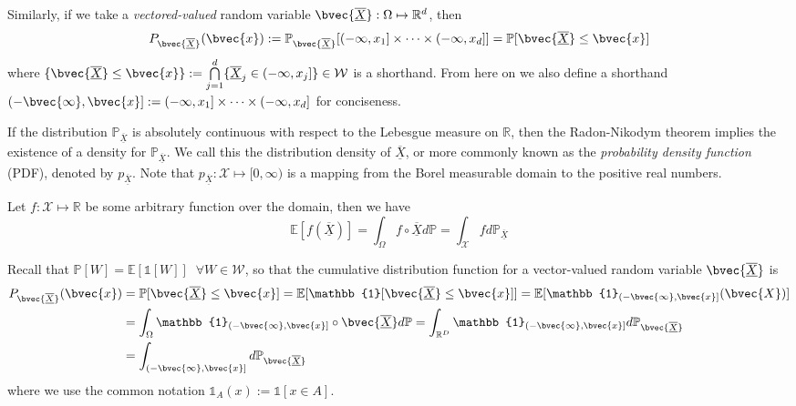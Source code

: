 \documentclass[twoside]{article} \usepackage{aistats2017}
\newcommand{\rv}[1]{\underline{\overline{#1}}}
\begin{document}
		Similarly, if we take a \textit{vectored-valued} random variable $\bvec{\rv{X}} : \Omega \mapsto \mathbb{R}^{d}$, then 
		\begin{equation}
			P_{\bvec{\rv{X}}}(\bvec{x}) := \mathbb{P}_{\bvec{\rv{X}}}[(-\infty, x_{1}] \times \dots \times (-\infty, x_{d}]] = \mathbb{P}[\bvec{\rv{X}} \leq \bvec{x}]
		\label{eq:cdf_vector}
		\end{equation}
		where $\{\bvec{\rv{X}} \leq \bvec{x}\} := \bigcap\limits_{j = 1}^{d} \{\rv{X}_{j} \in (-\infty, x_{j}]\} \in \mathcal{W}$ is a shorthand. From here on we also define a shorthand $(-\bvec{\infty}, \bvec{x}] := (-\infty, x_{1}] \times \dots \times (-\infty, x_{d}]$ for conciseness.
				
		
		If the distribution $\mathbb{P}_{\rv{X}}$ is absolutely continuous with respect to the Lebesgue measure on $\mathbb{R}$, then the Radon-Nikodym theorem implies the existence of a density for $\mathbb{P}_{\rv{X}}$. We call this the distribution density of $\rv{X}$, or more commonly known as the \textit{probability density function} (PDF), denoted by $p_{\rv{X}}$. Note that $p_{\rv{X}} : \mathcal{X} \mapsto [0, \infty)$ is a mapping from the Borel measurable domain to the positive real numbers.
		
		Let $f : \mathcal{X} \mapsto \mathbb{R}$ be some arbitrary function over the domain, then we have
		\begin{equation}
			\mathbb{E}[f(\rv{X})] = \int_{\Omega} f \circ \rv{X} d \mathbb{P} = \int_{\mathcal{X}} f d \mathbb{P}_{\rv{X}}
		\label{eq:functional_expectation}
		\end{equation}
		
		Recall that $\mathbb{P}[W] = \mathbb{E}[\mathbb{1}[W]] \;\; \forall W \in \mathcal{W}$, so that the cumulative distribution function for a vector-valued random variable $\bvec{\rv{X}}$ is
		\begin{equation}
			\begin{aligned}
				P_{\bvec{\rv{X}}}(\bvec{x}) &= \mathbb{P}[\bvec{\rv{X}} \leq \bvec{x}] = \mathbb{E}[\mathbb{1}[\bvec{\rv{X}} \leq \bvec{x}]] = \mathbb{E}[\mathbb{1}_{(-\bvec{\infty}, \bvec{x}]}(\bvec{X})] \\
				&= \int_{\Omega} \mathbb{1}_{(-\bvec{\infty}, \bvec{x}]} \circ \bvec{\rv{X}} d \mathbb{P} = \int_{\mathbb{R}^{D}} \mathbb{1}_{(-\bvec{\infty}, \bvec{x}]} d \mathbb{P}_{\bvec{\rv{X}}} \\
				&= \int_{(-\bvec{\infty}, \bvec{x}]} d \mathbb{P}_{\bvec{\rv{X}}}
			\end{aligned}
		\label{eq:cdf_integral}
		\end{equation}
		where we use the common notation $\mathbb{1}_{A}(x) := \mathbb{1}[x \in A]$.
		
\end{document}
